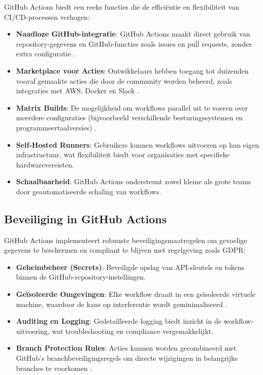 GitHub Actions biedt een reeks functies die de efficiëntie en flexibiliteit van CI/CD-processen verhogen:
\begin{itemize}
    \item \textbf{Naadloze GitHub-integratie}: GitHub Actions maakt direct gebruik van repository-gegevens en GitHub-functies zoals issues en pull requests, zonder extra configuratie \autocite{githubdocs2023actions}.
    \item \textbf{Marketplace voor Acties}: Ontwikkelaars hebben toegang tot duizenden vooraf gemaakte acties die door de community worden beheerd, zoals integraties met AWS, Docker en Slack \autocite{kulkarni2022}.
    \item \textbf{Matrix Builds}: De mogelijkheid om workflows parallel uit te voeren over meerdere configuraties (bijvoorbeeld verschillende besturingssystemen en programmeertaalversies) \autocite{spacelift2023}.
    \item \textbf{Self-Hosted Runners}: Gebruikers kunnen workflows uitvoeren op hun eigen infrastructuur, wat flexibiliteit biedt voor organisaties met specifieke hardwarevereisten.
    \item \textbf{Schaalbaarheid}: GitHub Actions ondersteunt zowel kleine als grote teams door geautomatiseerde schaling van workflows.
\end{itemize}

\subsection{Beveiliging in GitHub Actions}

GitHub Actions implementeert robuuste beveiligingsmaatregelen om gevoelige gegevens te beschermen en compliant te blijven met regelgeving zoals GDPR:
\begin{itemize}
    \item \textbf{Geheimbeheer (Secrets)}: Beveiligde opslag van API-sleutels en tokens binnen de GitHub-repository-instellingen.
    \item \textbf{Geïsoleerde Omgevingen}: Elke workflow draait in een geïsoleerde virtuele machine, waardoor de kans op interferentie wordt geminimaliseerd \autocite{spacelift2023}.
    \item \textbf{Auditing en Logging}: Gedetailleerde logging biedt inzicht in de workflow-uitvoering, wat troubleshooting en compliance vergemakkelijkt.
    \item \textbf{Branch Protection Rules}: Acties kunnen worden gecombineerd met GitHub's branchbeveiligingsregels om directe wijzigingen in belangrijke branches te voorkomen \autocite{kulkarni2022}.
\end{itemize}

